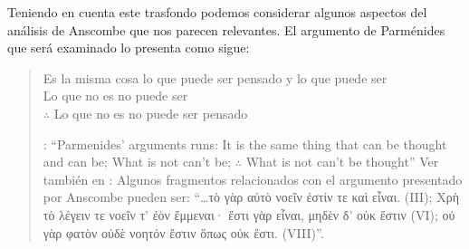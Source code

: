 Teniendo en cuenta este trasfondo podemos considerar algunos aspectos del análisis de Anscombe que nos parecen relevantes. El argumento de Parménides que será examinado lo presenta como sigue: \blockquote[{\Cite[3]{anscombe1981parmenides:pmc}}: \enquote{Parmenides' arguments runs: It is the same thing that can be thought and can be; What is not can't be; $\therefore$ What is not can't be thought} Ver también en {\cite[22-25]{parmenides2007poema}}: Algunos fragmentos relacionados con el argumento presentado por Anscombe pueden ser: \enquote{\ldots\textgreek{τὸ γὰρ αὐτὸ νοεῖν ἐστίν τε καὶ εἶναι.} (III); \textgreek{Χρὴ τὸ λέγειν τε νοεῖν τ' ἐὸν ἔμμεναι· ἔστι γὰρ εἶναι, μηδὲν δ' οὐκ ἔστιν} (VI); \textelp{} \textgreek{οὐ γὰρ φατὸν οὐδὲ νοητόν ἔστιν ὅπως οὐκ ἔστι.} (VIII)}.]{Es la misma cosa lo que puede ser pensado y lo que puede ser\\
Lo que no es no puede ser\\
$\therefore$ Lo que no es no puede ser pensado}

